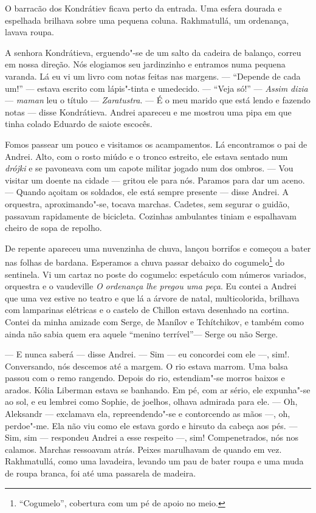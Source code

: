 O barracão dos Kondrátiev ficava perto da entrada. Uma esfera dourada e
espelhada brilhava sobre uma pequena coluna. Rakhmatullá, um ordenança,
lavava roupa.

A senhora Kondrátieva, erguendo"-se de um salto da cadeira de balanço,
correu em nossa direção. Nós elogiamos seu jardinzinho e entramos numa
pequena varanda. Lá eu vi um livro com notas feitas nas margens. ---
``Depende de cada um!'' --- estava escrito com lápis"-tinta e umedecido.
--- ``Veja só!'' --- \emph{Assim dizia} --- \emph{maman} leu o título
--- \emph{Zaratustra}. --- É o meu marido que está lendo e fazendo notas
--- disse Kondrátieva. Andrei apareceu e me mostrou uma pipa em que
tinha colado Eduardo \scalebox{.8}{VII} de saiote escocês.

Fomos passear um pouco e visitamos os acampamentos. Lá encontramos o pai
de Andrei. Alto, com o rosto miúdo e o tronco estreito, ele estava
sentado num \emph{drójki} e se pavoneava com um capote militar jogado
num dos ombros. --- Vou visitar um doente na cidade --- gritou ele para
nós. Paramos para dar um aceno. --- Quando açoitam os soldados, ele está
sempre presente --- disse Andrei. A orquestra, aproximando"-se, tocava
marchas. Cadetes, sem segurar o guidão, passavam rapidamente de
bicicleta. Cozinhas ambulantes tiniam e espalhavam cheiro de sopa de
repolho.

De repente apareceu uma nuvenzinha de chuva, lançou borrifos e começou a
bater nas folhas de bardana. Esperamos a chuva passar debaixo do
cogumelo\footnote{``Cogumelo'', cobertura com um pé de apoio no meio.}
do sentinela. Vi um cartaz no poste do cogumelo: espetáculo com números
variados, orquestra e o vaudeville \emph{O ordenança lhe pregou uma
peça}. Eu contei a Andrei que uma vez estive no teatro e que lá a árvore
de natal, multicolorida, brilhava com lamparinas elétricas e o castelo
de Chillon estava desenhado na cortina. Contei da minha amizade com
Serge, de Manílov e Tchítchikov, e também como ainda não sabia quem era
aquele ``menino terrível''--- Serge ou não Serge.

--- E nunca saberá --- disse Andrei. --- Sim --- eu concordei com ele
---, sim!. Conversando, nós descemos até a margem. O rio estava marrom.
Uma balsa passou com o remo rangendo. Depois do rio, estendiam"-se morros
baixos e arados. Kólia Liberman estava se banhando. Em pé, com ar sério,
ele expunha"-se ao sol, e eu lembrei como Sophie, de joelhos, olhava
admirada para ele. --- Oh, Aleksandr --- exclamava ela, repreendendo"-se
e contorcendo as mãos ---, oh, perdoe"-me. Ela não viu como ele estava
gordo e hirsuto da cabeça aos pés. --- Sim, sim --- respondeu Andrei a
esse respeito ---, sim! Compenetrados, nós nos calamos. Marchas
ressoavam atrás. Peixes marulhavam de quando em vez. Rakhmatullá, como
uma lavadeira, levando um pau de bater roupa e uma muda de roupa branca,
foi até uma passarela de madeira.

